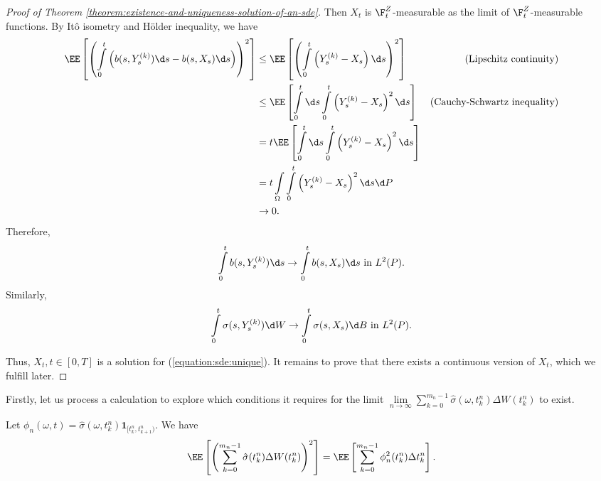 \begin{proof}[Proof of Theorem \ref{theorem:existence-and-uniqueness-solution-of-an-sde}]
    Then $X_t$ is $\F_t^Z$-measurable as the limit of $\F_t^Z$-measurable functions. By Itô isometry and Hölder inequality, we have
    \begin{align*}
        \EE\left[\left(\int\limits_0^t \left(b(s,Y_s^{(k)})\d s - b(s,X_s)\d s\right)\right)^2\right]
         & \le \EE\left[\left(\int\limits_0^t \left(Y_s^{(k)}-X_s\right)\d s\right)^2\right]      & \text{(Lipschitz continuity)}       \\
         & \le \EE\left[\int\limits_0^t\d s\int\limits_0^t\left(Y_s^{(k)}-X_s\right)^2\d s\right] & \text{(Cauchy-Schwartz inequality)} \\
         & =t\EE\left[\int\limits_0^t\d s\int\limits_0^t\left(Y_s^{(k)}-X_s\right)^2\d s\right]                                         \\
         & =t \int\limits_{\Omega}\int\limits_0^t\left(Y_s^{(k)}-X_s\right)^2\d s\d P                                                   \\
         & \to 0.
    \end{align*}
    Therefore,
    $$\int\limits_0^t b(s,Y_s^{(k)})\d s\to \int\limits_0^t b(s,X_s)\d s \text{ in } L^2(P).$$
    Similarly,
    $$\int\limits_0^t \sigma(s,Y_s^{(k)})\d W\to \int\limits_0^t \sigma(s,X_s)\d B \text{ in } L^2(P).$$

    Thus, $X_t, t\in[0,T]$ is a solution for (\ref{equation:sde:unique}). It remains to prove that there exists a continuous version of $X_t$, which we fulfill later.
\end{proof}

Firstly, let us process a calculation to explore which conditions it requires for the limit $\lim\limits_{n\to\infty}\sum\limits_{k=0}^{m_n-1} \hat{\sigma}(\omega, t_k^n)\Delta W(t^n_{k})$ to exist.


\begin{proposition}
    Let $\phi_n(\omega, t) = \hat{\sigma}(\omega, t_k^n)\mathbf{1}_{[t_k^n, t_{k+1}^n)}$. We have
    $$\EE\left[\left(\sum\limits_{k=0}^{m_n-1} \hat{\sigma}(t_k^n)\Delta W(t^n_{k})\right)^2\right] = \EE\left[\sum\limits_{k=0}^{m_n-1} \phi_n^2(t_{k}^n) \Delta t_k^n\right].$$
\end{proposition}

